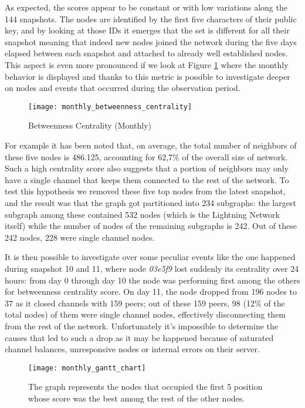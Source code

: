 	As expected, the scores appear to be constant or with low variations along the 144 snapshots. The nodes are identified by the first five characters of their public key, and by looking at those IDs it emerges that the set is different for all their snapshot meaning that indeed new nodes joined the network during the five days elapsed between each snapshot and attached to already well established nodes. This aspect is even more pronounced if we look at Figure \ref{monthly_betweenness_centrality} where the monthly behavior is displayed and thanks to this metric is possible to investigate deeper on nodes and events that occurred during the observation period. 
	
	\begin{figure}[ht!]
		\centering
		\texttt{[image: monthly\_betweenness\_centrality]}
		\caption{Betweenness Centrality (Monthly)}
		\label{monthly_betweenness_centrality}
	\end{figure}		
	
	For example it has been noted that, on average, the total number of neighbors of these five nodes is 486.125, accounting for 62,7\% of the overall size of network. Such a high centrality score also suggests that a portion of neighbors may only have a single channel that keeps them connected to the rest of the network. To test this hypothesis we removed these five top nodes from the latest snapshot, and the result was that the graph got partitioned into 234 subgraphs: the largest subgraph among these contained 532 nodes (which is the Lightning Network itself) while the number of nodes of the remaining subgraphs is 242. Out of these 242 nodes, 228 were single channel nodes.

	It is then possible to investigate over some peculiar events like the one happened during snapshot 10 and 11, where node \textit{03e5f9} lost suddenly its centrality over 24 hours: 
	from day 0 through day 10 the node was performing first among the others for betweenness centrality score. On day 11, the node dropped from 196 nodes to 37 as it closed channels with 159 peers; out of these 159 peers, 98 (12\% of the total nodes) of them were single channel nodes, effectively disconnecting them from the rest of the network. Unfortunately it's impossible to determine the causes that led to such a drop as it may be happened because of saturated channel balances, unresponsive nodes or internal errors on their server.
	
	\begin{figure}[ht!]
		\centering
		\texttt{[image: monthly\_gantt\_chart]}
		\caption{The graph represents the nodes that occupied the first 5 position whose score was the best among the rest of the other nodes.}
		\label{monthly_gantt}
	\end{figure}
	
